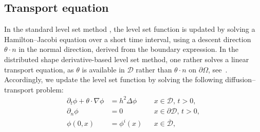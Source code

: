 \documentclass[preprint,9pt]{elsarticle}
\begin{document}
\subsection{Transport equation}\label{sub:level}

In the standard level set method \cite{MR965860},
the level set function is updated by solving
a Hamilton--Jacobi equation over a short time interval,
using a descent direction $\theta\cdot n$
in the normal direction,  derived from the boundary expression.
In the distributed shape derivative-based level set method,
one rather solves a linear transport equation, as $\theta$ is available
in $\mathcal{D}$ rather than $\theta\cdot n$ on $\partial\Omega$,
see~\cite{MR3535238}.  
Accordingly, we update the level set function by solving the following diffusion--transport problem:
\begin{equation}\label{eq:transport}
\begin{aligned}
	\partial_t \phi+\theta\cdot\nabla\phi
		&= h^2\Delta\phi && x\in \mathcal{D},\, t>0, \\
	\partial_{n} \phi
		&= 0 && x\in \partial\mathcal{D},\, t>0, \\
	\phi(0, x)
		&= \phi^{i}(x) && x\in \overline{\mathcal{D}},
\end{aligned}
\end{equation}
\end{document}
